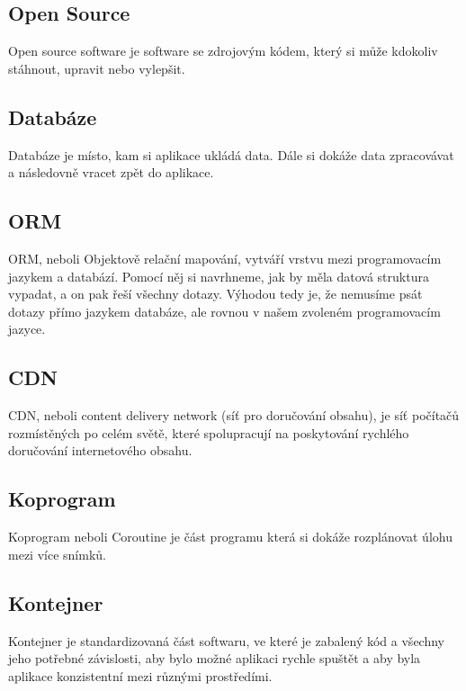 \subsection{Open Source}
Open source software je software se zdrojovým kódem, který si může kdokoliv stáhnout, upravit nebo vylepšit. \cite{OpenSource}

\subsection{Databáze}
Databáze je místo, kam si aplikace ukládá data. Dále si dokáže data zpracovávat a následovně vracet zpět do aplikace.

\subsection{ORM}
ORM, neboli Objektově relační mapování, vytváří vrstvu mezi programovacím jazykem a databází. Pomocí něj si navrhneme, jak by měla datová struktura vypadat, a on pak řeší všechny dotazy. Výhodou tedy je, že nemusíme psát dotazy přímo jazykem databáze, ale rovnou v našem zvoleném programovacím jazyce.

\subsection{CDN}
CDN, neboli content delivery network (síť pro doručování obsahu), je síť počítačů rozmístěných po celém světě, které spolupracují na poskytování rychlého doručování internetového obsahu.\cite{CDN}

\subsection{Koprogram}
Koprogram neboli Coroutine je část programu která si dokáže rozplánovat úlohu mezi více snímků.\cite{Coroutine} 

\subsection{Kontejner}
Kontejner je standardizovaná část softwaru, ve které je zabalený kód a všechny jeho potřebné závislosti, aby bylo možné aplikaci rychle spuštět a aby byla aplikace konzistentní mezi různými prostředími. \cite{Kontejner}
